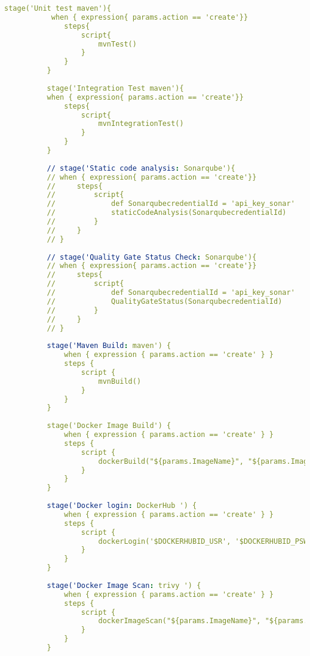 \begin{lstlisting}[language=yaml, style=yamlstyle]
          stage('Unit test maven'){
           when { expression{ params.action == 'create'}}
              steps{
                  script{
                      mvnTest()
                  }
              }
          }
  
          stage('Integration Test maven'){
          when { expression{ params.action == 'create'}}
              steps{
                  script{
                      mvnIntegrationTest()
                  }
              }
          }
  
          // stage('Static code analysis: Sonarqube'){
          // when { expression{ params.action == 'create'}}
          //     steps{
          //         script{
          //             def SonarqubecredentialId = 'api_key_sonar'
          //             staticCodeAnalysis(SonarqubecredentialId)
          //         }
          //     }
          // }
  
          // stage('Quality Gate Status Check: Sonarqube'){
          // when { expression{ params.action == 'create'}}
          //     steps{
          //         script{
          //             def SonarqubecredentialId = 'api_key_sonar'
          //             QualityGateStatus(SonarqubecredentialId)
          //         }
          //     }
          // }
  
          stage('Maven Build: maven') {
              when { expression { params.action == 'create' } }
              steps {
                  script {
                      mvnBuild()
                  }
              }
          }
  
          stage('Docker Image Build') {
              when { expression { params.action == 'create' } }
              steps {
                  script {
                      dockerBuild("${params.ImageName}", "${params.ImageTag}", '$DOCKERHUBID_USR')
                  }
              }
          }
  
          stage('Docker login: DockerHub ') {
              when { expression { params.action == 'create' } }
              steps {
                  script {
                      dockerLogin('$DOCKERHUBID_USR', '$DOCKERHUBID_PSW')
                  }
              }
          }
  
          stage('Docker Image Scan: trivy ') {
              when { expression { params.action == 'create' } }
              steps {
                  script {
                      dockerImageScan("${params.ImageName}", "${params.ImageTag}", '$DOCKERHUBID_USR')
                  }
              }
          }
  

\end{lstlisting}
